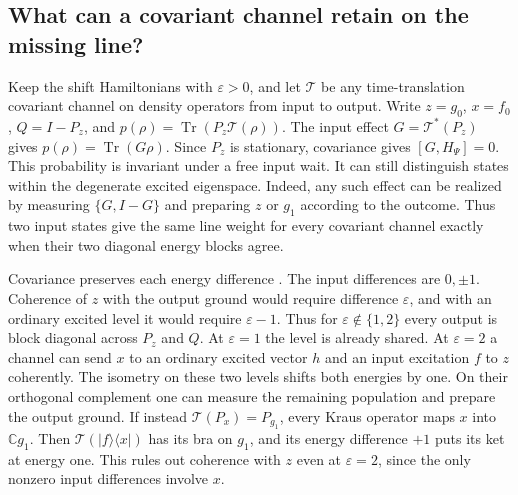 \documentclass[11pt]{article}
\theoremstyle{definition}
\DeclareMathOperator{\Tr}{Tr}
\newcommand{\C}{\mathbb C}
\newcommand{\ket}[1]{\lvert #1\rangle}
\newcommand{\bra}[1]{\langle #1\rvert}
\begin{document}
\subsection{What can a covariant channel retain on the missing line?}
\label{subsec:shift-channel-coherence}

Keep the shift Hamiltonians with $\varepsilon>0$, and let $\mathcal T$ be any time-translation covariant channel on density operators from input to output. Write $z=g_0$, $x=f_0$, $Q=I-P_z$, and $p(\rho)=\Tr(P_z\mathcal T(\rho))$. The input effect $G=\mathcal T^*(P_z)$ gives $p(\rho)=\Tr(G\rho)$. Since $P_z$ is stationary, covariance gives $[G,H_\Psi]=0$. This probability is invariant under a free input wait. It can still distinguish states within the degenerate excited eigenspace. Indeed, any such effect can be realized by measuring $\{G,I-G\}$ and preparing $z$ or $g_1$ according to the outcome. Thus two input states give the same line weight for every covariant channel exactly when their two diagonal energy blocks agree.

Covariance preserves each energy difference \cite{MarvianSpekkens}. The input differences are $0,\pm1$. Coherence of $z$ with the output ground would require difference $\varepsilon$, and with an ordinary excited level it would require $\varepsilon-1$. Thus for $\varepsilon\notin\{1,2\}$ every output is block diagonal across $P_z$ and $Q$. At $\varepsilon=1$ the level is already shared. At $\varepsilon=2$ a channel can send $x$ to an ordinary excited vector $h$ and an input excitation $f$ to $z$ coherently. The isometry on these two levels shifts both energies by one. On their orthogonal complement one can measure the remaining population and prepare the output ground. If instead $\mathcal T(P_x)=P_{g_1}$, every Kraus operator maps $x$ into $\C g_1$. Then $\mathcal T(\ket{f}\bra{x})$ has its bra on $g_1$, and its energy difference $+1$ puts its ket at energy one. This rules out coherence with $z$ even at $\varepsilon=2$, since the only nonzero input differences involve $x$.
\end{document}
